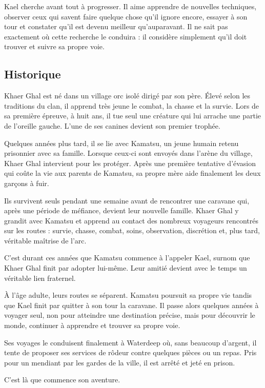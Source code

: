 Kael cherche avant tout à progresser. Il aime apprendre de nouvelles techniques,
observer ceux qui savent faire quelque chose qu'il ignore encore, essayer à son
tour et constater qu'il est devenu meilleur qu'auparavant. Il ne sait pas
exactement où cette recherche le conduira : il considère simplement qu'il doit
trouver et suivre sa propre voie.

\subsection*{Historique}

Khaer Ghal est né dans un village orc isolé dirigé par son père. Élevé selon
les traditions du clan, il apprend très jeune le combat, la chasse et la
survie. Lors de sa première épreuve, à huit ans, il tue seul une créature qui
lui arrache une partie de l'oreille gauche. L'une de ses canines devient son
premier trophée.

Quelques années plus tard, il se lie avec Kamatsu, un jeune humain retenu
prisonnier avec sa famille. Lorsque ceux-ci sont envoyés dans l'arène du
village, Khaer Ghal intervient pour les protéger. Après une première tentative
d'évasion qui coûte la vie aux parents de Kamatsu, sa propre mère aide
finalement les deux garçons à fuir.

Ils survivent seuls pendant une semaine avant de rencontrer une caravane qui,
après une période de méfiance, devient leur nouvelle famille. Khaer Ghal y
grandit avec Kamatsu et apprend au contact des nombreux voyageurs rencontrés
sur les routes : survie, chasse, combat, soins, observation, discrétion et,
plus tard, véritable maîtrise de l'arc.

C'est durant ces années que Kamatsu commence à l'appeler Kael, surnom que
Khaer Ghal finit par adopter lui-même. Leur amitié devient avec le temps un
véritable lien fraternel.

À l'âge adulte, leurs routes se séparent. Kamatsu poursuit sa propre vie tandis
que Kael finit par quitter à son tour la caravane. Il passe alors quelques
années à voyager seul, non pour atteindre une destination précise, mais pour
découvrir le monde, continuer à apprendre et trouver sa propre voie.

Ses voyages le conduisent finalement à Waterdeep où, sans beaucoup d'argent,
il tente de proposer ses services de rôdeur contre quelques pièces ou un
repas. Pris pour un mendiant par les gardes de la ville, il est arrêté et jeté
en prison.

C'est là que commence son aventure.

